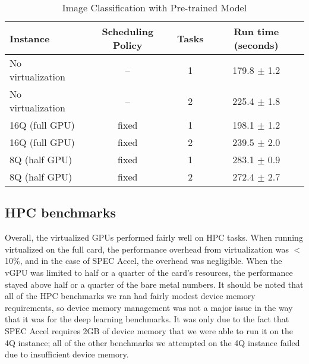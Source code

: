 \documentclass[acmsmall, authorversion]{acmart}
\begin{document}
\begin{table}[t]
\centering
\caption{Image Classification with Pre-trained Model}
\label{tab:vggclass}

\begin{tabular}{lccc}
\toprule
\textbf{Instance} & \textbf{Scheduling Policy} & \textbf{Tasks} & \textbf{Run time (seconds)} \\
\midrule
No virtualization & -- & 1 & 179.8 $\pm$ 1.2 \\
No virtualization & -- & 2 & 225.4 $\pm$ 1.8 \\
16Q (full GPU) & fixed & 1 & 198.1 $\pm$ 1.2 \\
16Q (full GPU) & fixed & 2 & 239.5 $\pm$ 2.0 \\
8Q (half GPU) & fixed & 1 & 283.1 $\pm$ 0.9 \\
8Q (half GPU) & fixed & 2 & 272.4 $\pm$ 2.7 \\

\bottomrule
\end{tabular}

\end{table}

\subsection {HPC benchmarks}
Overall, the virtualized GPUs performed fairly well on HPC tasks. When running virtualized on the full card, the performance overhead from virtualization was $<$ 10\%, and in the case of SPEC Accel, the overhead was negligible. When the vGPU was limited to half or a quarter of the card's resources, the performance stayed above half or a quarter of the bare metal numbers. It should be noted that all of the HPC benchmarks we ran had fairly modest device memory requirements, so device memory management was not a major issue in the way that it was for the deep learning benchmarks. It was only due to the fact that SPEC Accel requires 2GB of device memory that we were able to run it on the 4Q instance; all of the other benchmarks we attempted on the 4Q instance failed due to insufficient device memory.
\end{document}
